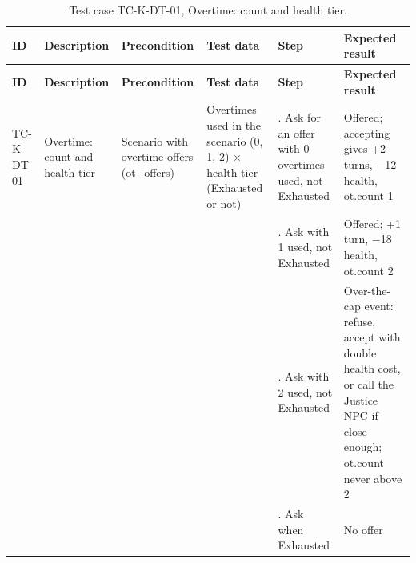 {\footnotesize{}\renewcommand{\arraystretch}{1.1}
\begin{longtable}{|>{\raggedright\arraybackslash}p{}|>{\raggedright\arraybackslash}p{}|>{\raggedright\arraybackslash}p{}|>{\raggedright\arraybackslash}p{}|>{\raggedright\arraybackslash}p{}|>{\raggedright\arraybackslash}p{}|}
\caption{Test case TC-K-DT-01, Overtime: count and health tier.} \\
\hline
\textbf{ID} & \textbf{Description} & \textbf{Precondition} & \textbf{Test data} & \textbf{Step} & \textbf{Expected result} \\ \hline
\endfirsthead
\hline
\textbf{ID} & \textbf{Description} & \textbf{Precondition} & \textbf{Test data} & \textbf{Step} & \textbf{Expected result} \\ \hline
\endhead
TC-K-DT-01 & Overtime: count and health tier & Scenario with overtime offers (ot\_offers) & Overtimes used in the scenario (0, 1, 2) $\times$ health tier (Exhausted or not) & 1. Ask for an offer with 0 overtimes used, not Exhausted & Offered; accepting gives +2 turns, $-$12 health, ot.count 1 \\ \cline{5-6}
 &  &  &  & 2. Ask with 1 used, not Exhausted & Offered; +1 turn, $-$18 health, ot.count 2 \\ \cline{5-6}
 &  &  &  & 3. Ask with 2 used, not Exhausted & Over-\allowbreak{}the-\allowbreak{}cap event: refuse, accept with double health cost, or call the Justice NPC if close enough; ot.count never above 2 \\ \cline{5-6}
 &  &  &  & 4. Ask when Exhausted & No offer \\ \hline
\end{longtable}
}

